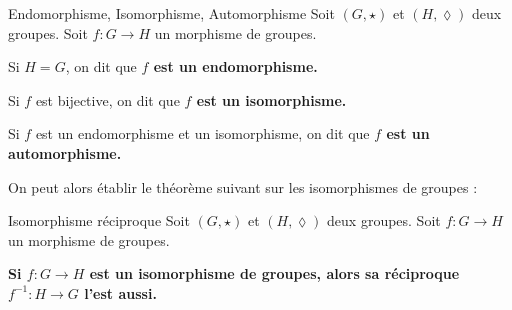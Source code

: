 \documentclass[a4paper,french,bookmarks]{article}
\begin{document}

\begin{definition}{Endomorphisme, Isomorphisme, Automorphisme}{}
    Soit  $(G, \star)$ et $(H, \lozenge)$ deux groupes. Soit $f: G \to H$ un morphisme de groupes.
    
    \begin{enumerate}
        \ithand Si $H = G$, on dit que \bf{$f$ est un endomorphisme}.
        
        \ithand Si $f$ est bijective, on dit que \bf{$f$ est un isomorphisme}.
        
        \ithand Si $f$ est un endomorphisme et un isomorphisme, on dit que \bf{$f$ est un automorphisme}.
    \end{enumerate}
    
\end{definition}

On peut alors établir le théorème suivant sur les isomorphismes de groupes :

\begin{theorem}{Isomorphisme réciproque}{}
    Soit  $(G, \star)$ et $(H, \lozenge)$ deux groupes. Soit $f: G \to H$ un morphisme de groupes. 
    
    \bf{Si $f: G \to H$ est un isomorphisme de groupes, alors sa réciproque $f^{-1}: H \to G$ l'est aussi.}
\end{theorem}
\end{document}
